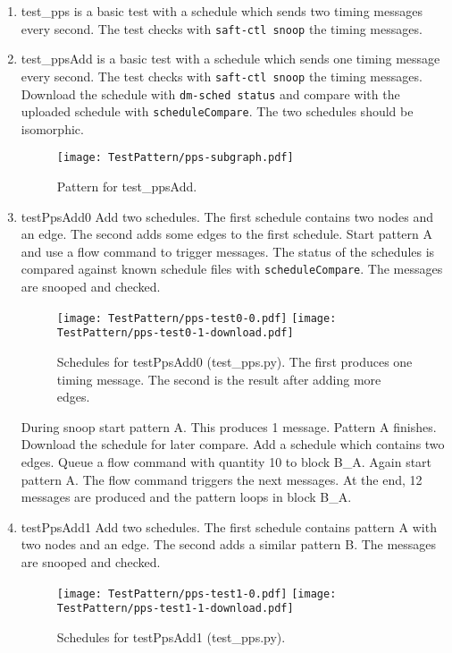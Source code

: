 \documentclass[12pt,a4paper]{report}
\begin{document}
\begin{enumerate}
\item test\_pps is a basic test with a
schedule which sends two timing messages every second. The test checks
with \texttt{saft-ctl snoop} the timing messages.

\item test\_ppsAdd is a basic test with a schedule which sends one timing
message every second. The test checks with \texttt{saft-ctl snoop} the timing
messages. Download the schedule with \texttt{dm-sched status} and compare
with the uploaded schedule with \texttt{scheduleCompare}. The two schedules
should be isomorphic.
    \begin{figure}
        \centering
        \texttt{[image: TestPattern/pps-subgraph.pdf]}
        \caption{Pattern for test\_ppsAdd.}
        \label{fig:Pattern_for_test_ppsAdd}
    \end{figure}

\item testPpsAdd0
    Add two schedules. The first schedule contains two nodes and an edge.
    The second adds some edges to the first schedule.
    Start pattern A and use a flow command to trigger messages.
    The status of the schedules is compared against known schedule files with
    \texttt{scheduleCompare}. The messages are snooped and checked.
    \begin{figure}
        \centering
        \texttt{[image: TestPattern/pps-test0-0.pdf]}
        \texttt{[image: TestPattern/pps-test0-1-download.pdf]}
        \caption{Schedules for testPpsAdd0 (test\_pps.py). The first produces
        one timing message. The second is the result after adding more edges.}
        \label{fig:Schedules_for_testPpsAdd0}
    \end{figure}
    During snoop start pattern A. This produces 1 message. Pattern A finishes.
    Download the schedule for later compare.
    Add a schedule which contains two edges.
    Queue a flow command with quantity 10 to block B\_A.
    Again start pattern A. The flow command triggers the next messages.
    At the end, 12 messages are produced and the pattern loops in block B\_A.

\item testPpsAdd1
    Add two schedules. The first schedule contains pattern A with two nodes and an edge.
    The second adds a similar pattern B.
    The messages are snooped and checked.
    \begin{figure}
        \centering
        \texttt{[image: TestPattern/pps-test1-0.pdf]}
        \texttt{[image: TestPattern/pps-test1-1-download.pdf]}
        \caption{Schedules for testPpsAdd1 (test\_pps.py).}
        \label{fig:Schedules_for_testPpsAdd1-0}
    \end{figure}


\end{enumerate}
\end{document}
